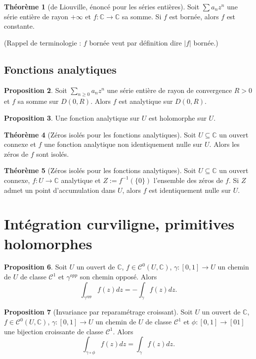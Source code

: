\documentclass[11pt,a4paper]{article}
\newcommand{\C}{\mathbb{C}}
\theoremstyle{definition}
\newtheorem{theoreme}{Th\'eor\`eme}[section]
\newtheorem{prop}[theoreme]{Proposition}
\theoremstyle{plain}
\begin{document}
\begin{theoreme}[de Liouville, énoncé pour les séries entières]
Soit $\sum a_nz^n$ une série entière de rayon $+\infty$ et $f:\C\to\C$ sa somme.
Si $f$ est bornée, alors $f$ est constante.
\end{theoreme}
(Rappel de terminologie : $f$  bornée veut par définition dire $|f|$ bornée.)


\subsection{Fonctions analytiques}

\begin{prop}
Soit $\sum_{n\geq 0}a_nz^n$ une série entière de rayon de convergence $R>0$ et $f$ sa somme sur $D(0,R)$.
Alors $f$ est analytique sur $D(0,R)$.
\end{prop}

\begin{prop}
Une fonction analytique sur $U$ est holomorphe sur $U$.
\end{prop}


\begin{theoreme}[Zéros isolés pour les fonctions analytiques]
Soit $U\subseteq \C$ un ouvert connexe et $f$ une fonction analytique non identiquement nulle sur $U$.
Alors les zéros de $f$ sont isolés.
\end{theoreme}

\begin{theoreme}[Zéros isolés pour les fonctions analytiques]
Soit $U\subseteq \C$ un ouvert connexe,  $f:U\to\C$ analytique et $Z:=f^{-1}(\{0\})$ l'ensemble des zéros de $f$.
Si $Z$ admet un point d'accumulation dans $U$, alors $f$ est identiquement nulle sur $U$.
\end{theoreme}



\section{Intégration curviligne, primitives holomorphes}


\begin{prop}
Soit $U$ un ouvert de $\C$, $f\in \mathcal C^0(U,\C)$,  $\gamma:[0,1]\to U$ un chemin de $U$ de classe $\mathcal C^1$ et $\gamma^{opp}$ son chemin opposé.
Alors 
\[  \int_{\gamma^{opp}} f(z)dz = -\int_\gamma f(z)dz.\]
\end{prop}

\begin{prop}[Invariance par reparamétrage croissant]
Soit $U$ un ouvert de $\C$, $f\in \mathcal C^0(U,\C)$,  $\gamma:[0,1]\to U$ un chemin de $U$ de classe $\mathcal C^1$ et $\phi : [0,1]\to [01]$ une bijection croissante de classe $\mathcal C^1$.
Alors 
\[  \int_{\gamma\circ \phi } f(z)dz = \int_\gamma f(z)dz.\]
\end{prop}
\end{document}
